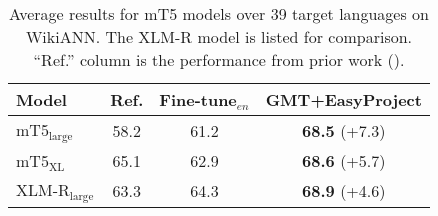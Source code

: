 \documentclass[11pt,dvipsnames]{article}
\begin{document}
\renewcommand{\arraystretch}{1.05}
\begin{table}[b!]
\centering
\small
\begin{tabular}{lccc}
\toprule
Model & Ref. & Fine-tune$_{\textit{en}}$ & GMT+EasyProject\\
\midrule
mT5$_{\text{large}}$ & 58.2 & 61.2 & \textbf{68.5} (+7.3)\\
mT5$_{\text{XL}}$ & 65.1 & 62.9 & \textbf{68.6} (+5.7)\\


XLM-R$_{\text{large}}$ & 63.3 & 64.3 & \textbf{68.9} (+4.6)\\
\bottomrule
\end{tabular}
\vspace{-5pt}
\caption{Average results  for  mT5 models over 39 target languages  on WikiANN. The XLM-R model is listed for comparison. ``Ref.'' column is the performance from prior work (\citeauthor{he2021effectiveness, xue2021mt5}).  }
 \vspace{-5pt}
\label{table:mt5}
\end{table}
\end{document}
